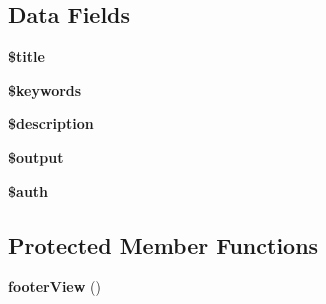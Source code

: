 \subsection*{Data Fields}
\begin{DoxyCompactItemize}
\item 
\hypertarget{class_controller_ada57e7bb7c152edad18fe2f166188691}{
{\bfseries \$title}}
\label{class_controller_ada57e7bb7c152edad18fe2f166188691}

\item 
\hypertarget{class_controller_a9fbd95bfcdf27d802a8c7938529a61ba}{
{\bfseries \$keywords}}
\label{class_controller_a9fbd95bfcdf27d802a8c7938529a61ba}

\item 
\hypertarget{class_controller_a87b032cba06009e3467abf1c8018d960}{
{\bfseries \$description}}
\label{class_controller_a87b032cba06009e3467abf1c8018d960}

\item 
\hypertarget{class_controller_a73004ce9cd673c1bfafd1dc351134797}{
{\bfseries \$output}}
\label{class_controller_a73004ce9cd673c1bfafd1dc351134797}

\item 
\hypertarget{class_controller_a20d7415a9c3391b32d7fe2136fce6e2c}{
{\bfseries \$auth}}
\label{class_controller_a20d7415a9c3391b32d7fe2136fce6e2c}

\end{DoxyCompactItemize}
\subsection*{Protected Member Functions}
\begin{DoxyCompactItemize}
\item 
\hypertarget{class_generic_page_controller_abc162466a8d8a9659b27938e0e44ca74}{
{\bfseries footerView} ()}
\label{class_generic_page_controller_abc162466a8d8a9659b27938e0e44ca74}

\end{DoxyCompactItemize}
